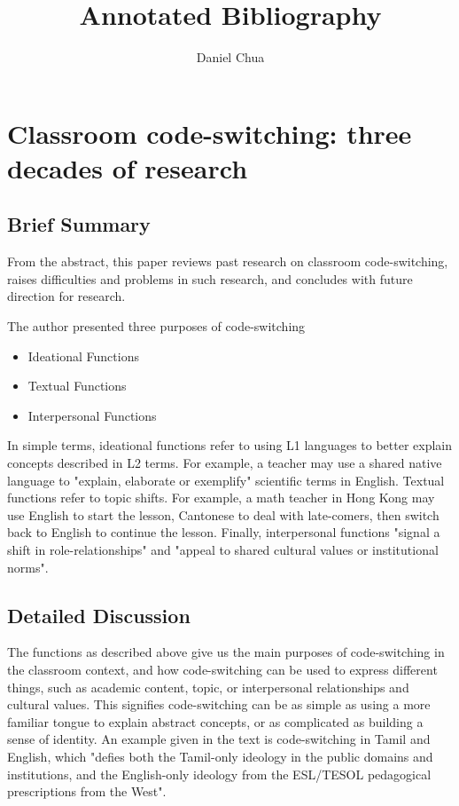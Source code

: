 \documentclass[12pt]{article}
\author{Daniel Chua}
\title{Annotated Bibliography}
\begin{document}
\maketitle

\section{Classroom code-switching: three decades of research~\cite{classroom}}

\subsection{Brief Summary}

From the abstract, this paper reviews past research on classroom code-switching, raises difficulties and problems in such research, and concludes with future direction for research.

The author presented three purposes of code-switching

\begin{itemize}
    \item Ideational Functions
    \item Textual Functions
    \item Interpersonal Functions
\end{itemize}

In simple terms, ideational functions refer to using L1 languages to better explain concepts described in L2 terms. For example, a teacher may use a shared native language to "explain, elaborate or exemplify" scientific terms in English. Textual functions refer to topic shifts. For example, a math teacher in Hong Kong may use English to start the lesson, Cantonese to deal with late-comers, then switch back to English to continue the lesson. Finally, interpersonal functions "signal a shift in role-relationships" and "appeal to shared cultural values or institutional norms".

\subsection{Detailed Discussion}

The functions as described above give us the main purposes of code-switching in the classroom context, and how code-switching can be used to express different things, such as academic content, topic, or interpersonal relationships and cultural values. This signifies code-switching can be as simple as using a more familiar tongue to explain abstract concepts, or as complicated as building a sense of identity. An example given in the text is code-switching in Tamil and English, which "defies both the Tamil-only ideology in the public domains and institutions, and the English-only ideology from the ESL/TESOL pedagogical prescriptions from the West".
\end{document}
